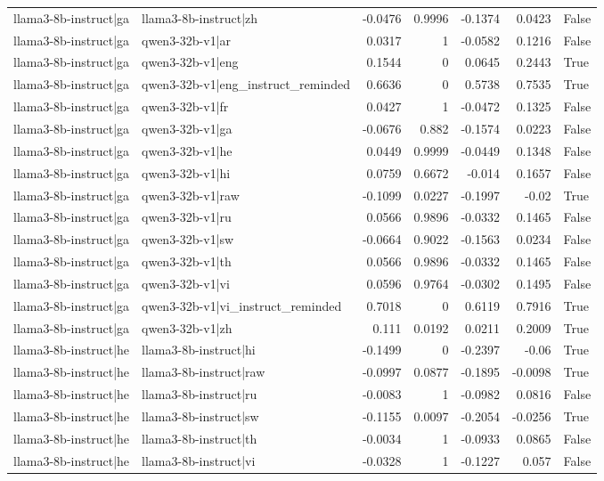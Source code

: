 \begin{table}
\begin{tabular}{l l r r r r l}
llama3-8b-instruct|ga & llama3-8b-instruct|zh & -0.0476 & 0.9996 & -0.1374 & 0.0423 & False \\
llama3-8b-instruct|ga & qwen3-32b-v1|ar & 0.0317 & 1 & -0.0582 & 0.1216 & False \\
llama3-8b-instruct|ga & qwen3-32b-v1|eng & 0.1544 & 0 & 0.0645 & 0.2443 & True \\
llama3-8b-instruct|ga & qwen3-32b-v1|eng_instruct_reminded & 0.6636 & 0 & 0.5738 & 0.7535 & True \\
llama3-8b-instruct|ga & qwen3-32b-v1|fr & 0.0427 & 1 & -0.0472 & 0.1325 & False \\
llama3-8b-instruct|ga & qwen3-32b-v1|ga & -0.0676 & 0.882 & -0.1574 & 0.0223 & False \\
llama3-8b-instruct|ga & qwen3-32b-v1|he & 0.0449 & 0.9999 & -0.0449 & 0.1348 & False \\
llama3-8b-instruct|ga & qwen3-32b-v1|hi & 0.0759 & 0.6672 & -0.014 & 0.1657 & False \\
llama3-8b-instruct|ga & qwen3-32b-v1|raw & -0.1099 & 0.0227 & -0.1997 & -0.02 & True \\
llama3-8b-instruct|ga & qwen3-32b-v1|ru & 0.0566 & 0.9896 & -0.0332 & 0.1465 & False \\
llama3-8b-instruct|ga & qwen3-32b-v1|sw & -0.0664 & 0.9022 & -0.1563 & 0.0234 & False \\
llama3-8b-instruct|ga & qwen3-32b-v1|th & 0.0566 & 0.9896 & -0.0332 & 0.1465 & False \\
llama3-8b-instruct|ga & qwen3-32b-v1|vi & 0.0596 & 0.9764 & -0.0302 & 0.1495 & False \\
llama3-8b-instruct|ga & qwen3-32b-v1|vi_instruct_reminded & 0.7018 & 0 & 0.6119 & 0.7916 & True \\
llama3-8b-instruct|ga & qwen3-32b-v1|zh & 0.111 & 0.0192 & 0.0211 & 0.2009 & True \\
llama3-8b-instruct|he & llama3-8b-instruct|hi & -0.1499 & 0 & -0.2397 & -0.06 & True \\
llama3-8b-instruct|he & llama3-8b-instruct|raw & -0.0997 & 0.0877 & -0.1895 & -0.0098 & True \\
llama3-8b-instruct|he & llama3-8b-instruct|ru & -0.0083 & 1 & -0.0982 & 0.0816 & False \\
llama3-8b-instruct|he & llama3-8b-instruct|sw & -0.1155 & 0.0097 & -0.2054 & -0.0256 & True \\
llama3-8b-instruct|he & llama3-8b-instruct|th & -0.0034 & 1 & -0.0933 & 0.0865 & False \\
llama3-8b-instruct|he & llama3-8b-instruct|vi & -0.0328 & 1 & -0.1227 & 0.057 & False \\

\end{tabular}
\end{table}
